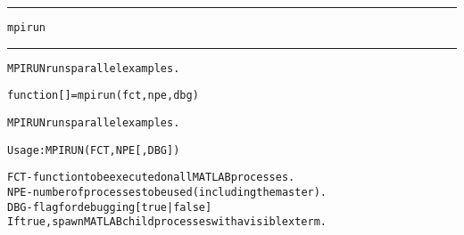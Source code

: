 \begin{samepage}
\hrule
\begin{center}
{\large \verb!mpirun!}
\label{p:mpirun}
\end{center}
\hrule\vspace{0.1in}



\begin{alltt}
MPIRUN runs parallel examples.
\end{alltt}

\end{samepage}



\begin{samepage}


\begin{alltt}
function [] = mpirun(fct,npe,dbg) 
\end{alltt}

\end{samepage}



\begin{alltt}
MPIRUN runs parallel examples.

  Usage: MPIRUN ( FCT , NPE [, DBG] )

  FCT - function to be executed on all MATLAB processes.
  NPE - number of processes to be used (including the master).
  DBG - flag for debugging [ true | {false} ]
        If true, spawn MATLAB child processes with a visible xterm.
\end{alltt}






\vspace{0.1in}